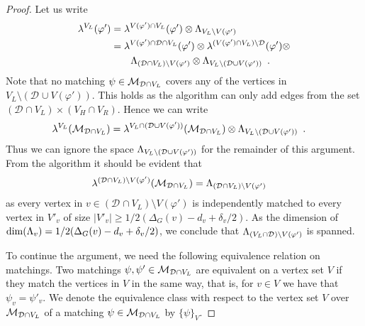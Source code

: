 \documentclass{article}
\newcommand{\set}[1]{\{ #1 \}}
\newcommand{\setsize}[1]{\lvert#1\rvert}
\newcommand{\eqperiod}{\enspace .}
\renewcommand{\deg}[2][XXXXXXXXXXXX]{\Delta_{#1}(#2)}
\newcommand{\ontodimLi}{1/2(\deg[G]{v} - d_v + \delta_v/2)}
\newcommand{\V}[1][]{V_{#1}}
\newcommand{\Vl}{\V[L]}
\newcommand{\Vr}{\V[R]}
\newcommand{\Vh}{\V[H]}
\newcommand{\linspace}[1][]{\ensuremath \Lambda_{{#1}}}
\newcommand{\linmapl}[2][]{\ensuremath \lambda^{{#2}}_{{#1}}}
\newcommand{\linmaplof}[3][]{\linmapl[#1]{#2}(#3)}
\newcommand{\diffclosure}[1][]{D_{{#1}}}
\renewcommand{\diffclosure}[1][]{\mathcal{D}_{{#1}}}
\newcommand{\matchb}{\varphi'}
\newcommand{\matchc}{\psi}
\newcommand{\matchd}{\psi'}
\newcommand{\matchings}[1][]{\ensuremath \mathcal{M}_{{#1}}}
\newcommand{\tensor}{\ensuremath \otimes}
\numberwithin{equation}{section}
\begin{document}
\begin{proof}
  Let us write
  \begin{align}
    \linmaplof{\Vl}{\matchb} 
    &=
    \linmaplof{V(\matchb) \cap \Vl}{\matchb} \tensor \linspace[\Vl
      \setminus V(\matchb)]\\
    &=
    \linmaplof{V(\matchb) \cap \diffclosure \cap \Vl}{\matchb} \tensor
      \linmaplof{(V(\matchb) \cap \Vl) \setminus
      \diffclosure}{\matchb} \tensor\nonumber\\
    &\qquad
      \linspace[(\diffclosure \cap \Vl) \setminus V(\matchb)] \tensor
      \linspace[\Vl \setminus (\diffclosure \cup V(\matchb))] 
      \eqperiod
  \end{align}
  Note that no matching $\matchc \in \matchings[\diffclosure \cap
  \Vl]$ covers any of the vertices in $\Vl \setminus (\diffclosure \cup V(\matchb))$.
  This holds as the algorithm can only add edges from the set
  $(\diffclosure \cap \Vl) \times (\Vh \cap \Vr)$.
  Hence we can write
  \begin{align}
    \linmaplof{\Vl}{\matchings[\diffclosure \cap \Vl]}
    &=
    \linmaplof{\Vl \cap (\diffclosure \cup V(\matchb))}
      {\matchings[\diffclosure \cap \Vl]} \tensor
      \linspace[\Vl \setminus (\diffclosure \cup V(\matchb))]
      \eqperiod
  \end{align}
  Thus we can ignore the space 
  $\linspace[\Vl \setminus (\diffclosure \cup V(\matchb))]$
  for the remainder of this argument.
  From the algorithm it should be evident that
  \begin{align}\label{eq:d_not_def}
    \linmaplof{(\diffclosure \cap \Vl) \setminus V(\matchb)}
      {\matchings[\diffclosure \cap \Vl]}
    &=
      \linspace[(\diffclosure \cap \Vl) \setminus V(\matchb)]
  \end{align}
  as every vertex in 
  $v \in (\diffclosure \cap \Vl) \setminus V(\matchb)$
  is independently matched to every vertex in $V'_{v}$ of size 
  $\setsize{V'_{v}} \ge \ontodimLi$. As the dimension of
  $\dim(\linspace[v]) = \ontodimLi$, we conclude that
  $\linspace[(\Vl \cap \diffclosure) \setminus V(\matchb)]$ is spanned.
  
  To continue the argument, we need the following equivalence relation
  on matchings. Two matchings
  $\matchc, \matchd \in \matchings[\diffclosure \cap \Vl]$ are
  equivalent on a vertex set $V$ if they match the vertices in $V$ in
  the same way, that is, for $v \in V$ we have that
  $\matchc_v = \matchd_v$. We denote the equivalence class with
  respect to the vertex set $V$ over
  $\matchings[\diffclosure \cap \Vl]$ of a matching
  $\matchc\in \matchings[\diffclosure \cap \Vl]$ by $\set{\matchc}_V$.


\end{proof}
\end{document}

